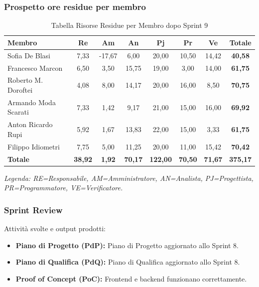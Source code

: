 \subsubsection{Prospetto ore residue per membro}
\begin{table}[H]
    \centering
    \renewcommand{\arraystretch}{1.3}
    \begin{tabularx}{\textwidth}{|X|c|c|c|c|c|c|c|}
        \hline
        \textbf{Membro} & \textbf{Re} & \textbf{Am} & \textbf{An} &
        \textbf{Pj} & \textbf{Pr} & \textbf{Ve} & \textbf{Totale} \\
        \hline
        Sofia De Blasi       &  7,33 & -17,67 &  6,00 & 20,00 & 10,50 & 14,42 & \textbf{40,58} \\
        Francesco Marcon     &  6,50 &  3,50 & 15,75 & 19,00 &  3,00 & 14,00 & \textbf{61,75} \\
        Roberto M. Doroftei  &  4,08 &  8,00 & 14,17 & 20,00 & 16,00 &  8,50 & \textbf{70,75} \\
        Armando Moda Scarati &  7,33 &  1,42 &  9,17 & 21,00 & 15,00 & 16,00 & \textbf{69,92} \\
        Anton Ricardo Rupi   &  5,92 &  1,67 & 13,83 & 22,00 & 15,00 &  3,33 & \textbf{61,75} \\
        Filippo Idiometri    &  7,75 &  5,00 & 11,25 & 20,00 & 11,00 & 15,42 & \textbf{70,42} \\
        \hline
        \textbf{Totale} &
        \textbf{38,92} & \textbf{1,92} & \textbf{70,17} &
        \textbf{122,00} & \textbf{70,50} & \textbf{71,67} &
        \textbf{375,17} \\
        \hline
    \end{tabularx}
    \begin{minipage}{\textwidth}
        \smallskip
        \footnotesize\textit{Legenda: RE=Responsabile, AM=Amministratore,
        AN=Analista, PJ=Progettista, PR=Programmatore, VE=Verificatore.}
    \end{minipage}
    \caption{Tabella Risorse Residue per Membro dopo Sprint 9}
\end{table}

\subsubsection{Sprint Review}
Attività svolte e output prodotti:
\begin{itemize}
    \item \textbf{Piano di Progetto (PdP):} Piano di Progetto aggiornato allo Sprint 8.
    \item \textbf{Piano di Qualifica (PdQ):} Piano di Qualifica aggiornato allo Sprint 8.
    \item \textbf{Proof of Concept (PoC):} Frontend e backend funzionano correttamente.
\end{itemize}

